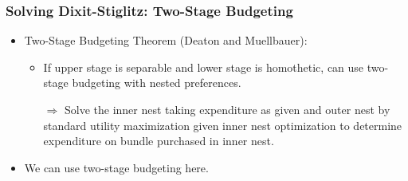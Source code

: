\documentclass[english,xcolor=svgnames]{beamer}
\begin{document}
\begin{frame}
\frametitle{Solving Dixit-Stiglitz: Two-Stage Budgeting}
\begin{itemize}
	\item Two-Stage Budgeting Theorem (Deaton and Muellbauer):
\begin{itemize}
	\item If upper stage is separable and lower stage is homothetic, can use two-stage budgeting with nested preferences.
	\item[$\Rightarrow$] Solve the inner nest taking expenditure as given and outer nest by standard utility maximization given inner nest optimization to determine expenditure on bundle purchased in inner nest.
	\end{itemize}
	\item We can use two-stage budgeting here.
\end{itemize}
\end{frame}
\end{document}
